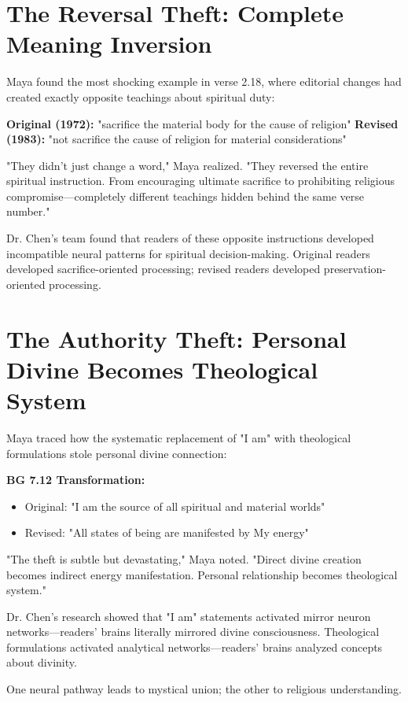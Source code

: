 \documentclass[11pt,twoside]{book}
\begin{document}
\section*{The Reversal Theft: Complete Meaning Inversion}
\label{sec:org16695aa}

Maya found the most shocking example in verse 2.18, where editorial changes had created exactly opposite teachings about spiritual duty:

\textbf{\textbf{Original (1972):}} "sacrifice the material body for the cause of religion"
\textbf{\textbf{Revised (1983):}} "not sacrifice the cause of religion for material considerations"

"They didn't just change a word," Maya realized. "They reversed the entire spiritual instruction. From encouraging ultimate sacrifice to prohibiting religious compromise—completely different teachings hidden behind the same verse number."

Dr. Chen's team found that readers of these opposite instructions developed incompatible neural patterns for spiritual decision-making. Original readers developed sacrifice-oriented processing; revised readers developed preservation-oriented processing.
\section*{The Authority Theft: Personal Divine Becomes Theological System}
\label{sec:org8d3d09f}

Maya traced how the systematic replacement of "I am" with theological formulations stole personal divine connection:

\textbf{\textbf{BG 7.12 Transformation:}}
\begin{itemize}
\item Original: "I am the source of all spiritual and material worlds"
\item Revised: "All states of being are manifested by My energy"
\end{itemize}

"The theft is subtle but devastating," Maya noted. "Direct divine creation becomes indirect energy manifestation. Personal relationship becomes theological system."

Dr. Chen's research showed that "I am" statements activated mirror neuron networks—readers' brains literally mirrored divine consciousness. Theological formulations activated analytical networks—readers' brains analyzed concepts about divinity.

One neural pathway leads to mystical union; the other to religious understanding.
\end{document}
